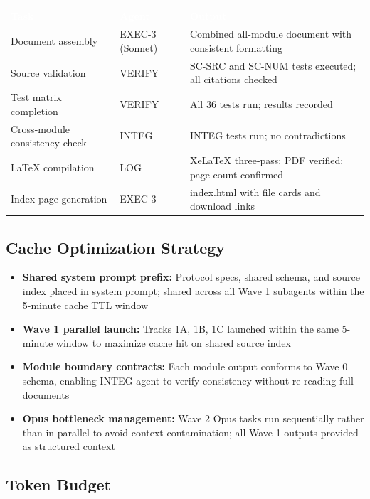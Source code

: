 \documentclass[11pt,letterpaper]{article}
\newcommand{\tableheader}[1]{\textbf{\sffamily\textcolor{white}{#1}}}
\begin{document}
\begin{center}
\begin{tabularx}{\textwidth}{L{3cm}L{2cm}X}
\toprule
{}
\tableheader{Task} & \tableheader{Agent} & \tableheader{Output} \\
\midrule
Document assembly & EXEC-3 (Sonnet) & Combined all-module document with consistent formatting \\
Source validation & VERIFY & SC-SRC and SC-NUM tests executed; all citations checked \\
Test matrix completion & VERIFY & All 36 tests run; results recorded \\
Cross-module consistency check & INTEG & INTEG tests run; no contradictions \\
LaTeX compilation & LOG & XeLaTeX three-pass; PDF verified; page count confirmed \\
Index page generation & EXEC-3 & index.html with file cards and download links \\
\bottomrule
\end{tabularx}
\end{center}

\subsection{Cache Optimization Strategy}

\begin{itemize}[leftmargin=1.5em]
  \item \textbf{Shared system prompt prefix:} Protocol specs, shared schema, and source index placed in system prompt; shared across all Wave 1 subagents within the 5-minute cache TTL window
  \item \textbf{Wave 1 parallel launch:} Tracks 1A, 1B, 1C launched within the same 5-minute window to maximize cache hit on shared source index
  \item \textbf{Module boundary contracts:} Each module output conforms to Wave 0 schema, enabling INTEG agent to verify consistency without re-reading full documents
  \item \textbf{Opus bottleneck management:} Wave 2 Opus tasks run sequentially rather than in parallel to avoid context contamination; all Wave 1 outputs provided as structured context
\end{itemize}

\subsection{Token Budget}
\end{document}
